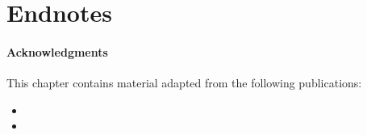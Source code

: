 \section*{Endnotes}
\paragraph{Acknowledgments}
This chapter contains material adapted from the following publications:
\begin{itemize}
\item {}
\item {}
\end{itemize}



